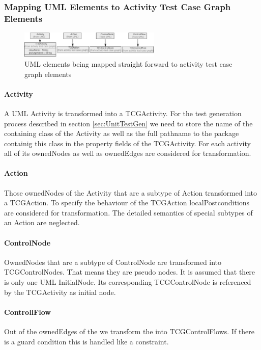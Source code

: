 \subsubsection{Mapping UML Elements to Activity Test Case Graph Elements}
\begin{figure}
\label{fig:UML2TCGTranformation}
\includegraphics[width=0.6\textwidth]{./pics/UML2TCGTransformation.pdf}
\caption{UML elements being mapped straight forward to activity test case graph elements}
\end{figure}

\paragraph{Activity}
A UML Activity is transformed into a TCGActivity. For the test generation process described in section \ref{sec:UnitTestGen} we need to store the name of the containing class of the Activity as well as the full pathname to the package containig this class in the property fields of the TCGActivity. For each activity all of its ownedNodes as well as ownedEdges are considered for transformation.
\paragraph{Action} Those ownedNodes of the Activity that are a subtype of Action transformed into a TCGAction. To specify the behaviour of the TCGAction localPostconditions are considered for transformation. The detailed semantics of special subtypes of an Action are neglected.
\paragraph{ControlNode}OwnedNodes that are a subtype of ControlNode are transformed into TCGControlNodes. That means they are pseudo nodes. It is assumed that there is only one UML InitialNode. Its corresponding TCGControlNode is referenced by the TCGActivity as initial node.
\paragraph{ControllFlow} Out of the ownedEdges of the  we transform the  into TCGControlFlows. If there is a guard condition this is handled like a constraint.

